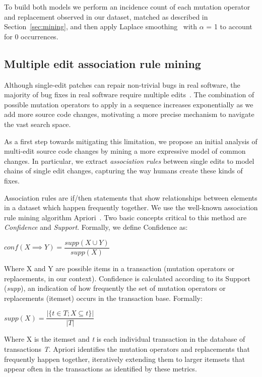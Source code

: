 \documentclass[conference]{IEEEtran}
\begin{document}
\vspace{1ex}
To build both models we perform an incidence count of each mutation operator and replacement observed in our
dataset, matched as described in Section~\ref{sec:mining}, and then apply Laplace smoothing~\cite{Russell10} with $\alpha$ = 1 to account for 0 occurrences.

\subsection{Multiple edit association rule mining} 
\label{multEdit}

Although single-edit patches can
repair non-trivial bugs in real software, the majority of bug fixes in real
software require multiple edits~\cite{zhong15,Soto16}. The combination of possible mutation
 operators to apply in a sequence increases exponentially as we add more source
 code changes, motivating a more precise mechanism to navigate the vast search
 space. 

As a first step towards mitigating this limitation, we propose 
an initial analysis of multi-edit 
source code changes by mining a more expressive model of common changes. In
particular, we extract \emph{association rules} between single edits 
to model chains of single edit changes, capturing the way humans create these kinds of fixes.

Association rules are if/then statements that show relationships between elements in a dataset which happen frequently together. We use the 
well-known association rule mining algorithm
Apriori~\cite{Agrawal94}. 
%
Two basic concepts critical to this method are \emph{Confidence} and \emph{Support}.
Formally, we define Confidence as:

\begin{center}
$conf(X \implies Y) = \dfrac{supp(X \cup Y)}{supp(X)}$ 
\end{center}

Where X and Y are possible items in a transaction (mutation operators or replacements, in our
context). Confidence is calculated according to its Support (\emph{supp}), 
an indication of how frequently the set of mutation operators or replacements (itemset) 
 occurs in the transaction base.
Formally:

\begin{center}
$supp(X) = \dfrac{|\{t \in T; X \subseteq t\}|}{|T|}$
\end{center}

Where X is the itemset and \emph{t} is each individual transaction in
the database of transactions \emph{T}. Apriori identifies the mutation
operators and replacements that frequently happen together, iteratively extending them to larger
itemsets that appear often in the transactions as identified by these metrics.
\end{document}
